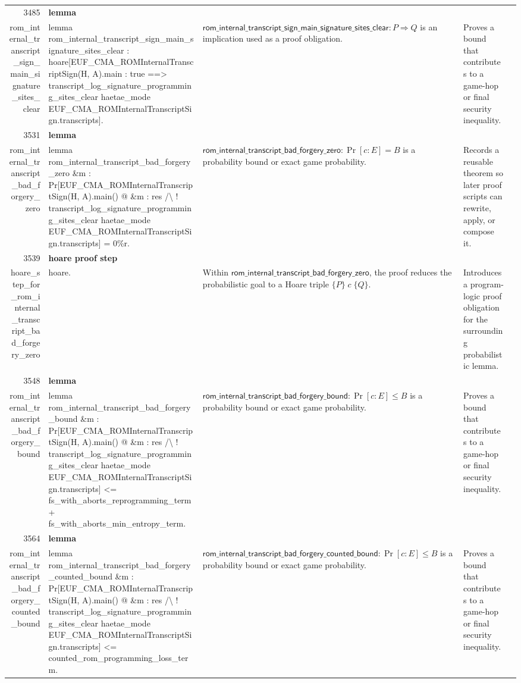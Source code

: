 \documentclass[10pt]{article}
\newcommand{\ec}[1]{\begingroup\ttfamily\scriptsize #1\endgroup}
\begin{document}
\begin{longtable}{r L{0.17\textwidth} L{0.26\textwidth} L{0.27\textwidth} L{0.20\textwidth}}
3485 & \textbf{lemma}\\\ec{rom\_internal\_transcript\_sign\_main\_signature\_sites\_clear} & \ec{lemma rom\_internal\_transcript\_sign\_main\_signature\_sites\_clear : hoare[EUF\_CMA\_ROMInternalTranscriptSign(H, A).main : true ==> transcript\_log\_signature\_programming\_sites\_clear haetae\_mode EUF\_CMA\_ROMInternalTranscriptSign.transcripts].} & \(\mathsf{rom\_internal\_transcript\_sign\_main\_signature\_sites\_clear} : P \Rightarrow Q\) is an implication used as a proof obligation. & Proves a bound that contributes to a game-hop or final security inequality. \\
3531 & \textbf{lemma}\\\ec{rom\_internal\_transcript\_bad\_forgery\_zero} & \ec{lemma rom\_internal\_transcript\_bad\_forgery\_zero \&m : Pr[EUF\_CMA\_ROMInternalTranscriptSign(H, A).main() @ \&m : res /\textbackslash{} ! transcript\_log\_signature\_programming\_sites\_clear haetae\_mode EUF\_CMA\_ROMInternalTranscriptSign.transcripts] = 0\%r.} & \(\mathsf{rom\_internal\_transcript\_bad\_forgery\_zero} : \Pr[c : E] = B\) is a probability bound or exact game probability. & Records a reusable theorem so later proof scripts can rewrite, apply, or compose it. \\
3539 & \textbf{hoare proof step}\\\ec{hoare\_step\_for\_rom\_internal\_transcript\_bad\_forgery\_zero} & \ec{hoare.} & Within \(\mathsf{rom\_internal\_transcript\_bad\_forgery\_zero}\), the proof reduces the probabilistic goal to a Hoare triple \(\{P\}\;c\;\{Q\}\). & Introduces a program-logic proof obligation for the surrounding probabilistic lemma. \\
3548 & \textbf{lemma}\\\ec{rom\_internal\_transcript\_bad\_forgery\_bound} & \ec{lemma rom\_internal\_transcript\_bad\_forgery\_bound \&m : Pr[EUF\_CMA\_ROMInternalTranscriptSign(H, A).main() @ \&m : res /\textbackslash{} ! transcript\_log\_signature\_programming\_sites\_clear haetae\_mode EUF\_CMA\_ROMInternalTranscriptSign.transcripts] <= fs\_with\_aborts\_reprogramming\_term + fs\_with\_aborts\_min\_entropy\_term.} & \(\mathsf{rom\_internal\_transcript\_bad\_forgery\_bound} : \Pr[c : E] \le B\) is a probability bound or exact game probability. & Proves a bound that contributes to a game-hop or final security inequality. \\
3564 & \textbf{lemma}\\\ec{rom\_internal\_transcript\_bad\_forgery\_counted\_bound} & \ec{lemma rom\_internal\_transcript\_bad\_forgery\_counted\_bound \&m : Pr[EUF\_CMA\_ROMInternalTranscriptSign(H, A).main() @ \&m : res /\textbackslash{} ! transcript\_log\_signature\_programming\_sites\_clear haetae\_mode EUF\_CMA\_ROMInternalTranscriptSign.transcripts] <= counted\_rom\_programming\_loss\_term.} & \(\mathsf{rom\_internal\_transcript\_bad\_forgery\_counted\_bound} : \Pr[c : E] \le B\) is a probability bound or exact game probability. & Proves a bound that contributes to a game-hop or final security inequality. \\

\end{longtable}
\end{document}
